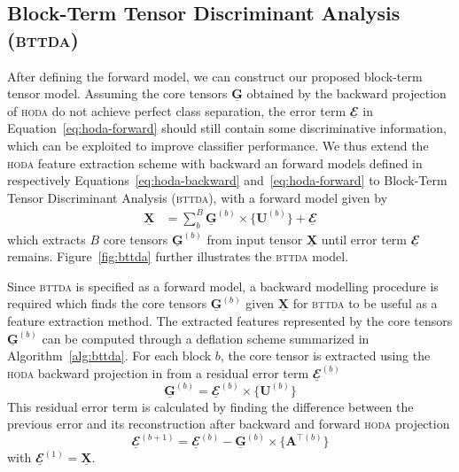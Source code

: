 \documentclass[twocolumn]{article}
\newcommand{\ten}[1]{\underline{\mathbf{#1}}} %
\newcommand{\mat}[1]{\mathbf{#1}} %
\newcommand{\mmpr}[1]{\times\{#1\}} %
\begin{document}
\subsection{Block-Term Tensor Discriminant Analysis (\textsc{bttda})}
After defining the forward model, we can construct our proposed block-term
tensor model. Assuming the core tensors $\ten{G}$
obtained by the backward projection of \textsc{hoda} do not achieve perfect
class separation, the error term $\ten{\mathbfcal{E}}$ in
Equation~\ref{eq:hoda-forward} should still contain some discriminative
information, which can be exploited to improve classifier performance.
We thus extend the \textsc{hoda} feature extraction scheme with backward an
forward models defined in respectively Equations~\ref{eq:hoda-backward}
and~\ref{eq:hoda-forward} to Block-Term Tensor Discriminant Analysis
(\textsc{bttda}), with a forward model given by
\begin{align}
  \ten{X} & = \sum_b^B\ten{G}^{(b)}\mmpr{\mat{U}^{(b)}} + \ten{\mathbfcal{E}}
  \label{eq:bttda-forward}
\end{align}
which extracts $B$ core tensors $\ten{G}^{(b)}$ from input tensor $\ten{X}$
until error term $\ten{\mathbfcal{E}}$ remains.
Figure~\ref{fig:bttda} further illustrates the \textsc{bttda} model.
\begin{figure*}
	\centering
	
  \caption{A forward model for Block-Term Tensor Discriminant Analysis
  (\textsc{bttda}). \textsc{bttda} can extract more features
 than \textsc{hoda} by iteratively finding a core tensor $\ten{G}^{(b)}$ in a
 deflation scheme.
 The \textsc{hoda} backward projection is first applied. Next, the reconstructed
 input data is reconstructed via the \textsc{hoda} forward model and the
 difference between the two is found.
 Finally, this process is repeated with this difference as input data, until a
 desired number of blocks $B$ has been found.}
  \label{fig:bttda}
\end{figure*}

Since \textsc{bttda} is specified as a forward model, a backward modelling
procedure is required which finds the core tensors $\ten{G}^{(b)}$ given $\ten{X}$ for
\textsc{bttda} to be useful as a feature extraction method.
The extracted features represented by the core tensors $\ten{G}^{(b)}$ can be
computed through a deflation scheme summarized in Algorithm~\ref{alg:bttda}.
For each block $b$, the core tensor is extracted using the \textsc{hoda} backward
projection in from a residual error term
$\ten{\mathbfcal{E}}^{(b)}$
\begin{equation}
  \ten{G}^{(b)} = \ten{\mathbfcal{E}}^{(b)}\mmpr{\mat{U}^{(b)}}
\end{equation}
This residual error term is calculated by finding the difference between the
previous error and its reconstruction after backward and forward \textsc{hoda}
projection
\begin{equation}
  \ten{\mathbfcal{E}}^{(b+1)} = \ten{\mathbfcal{E}}^{(b)} - \ten{G}^{(b)}
  \mmpr{\mat{A}^{\intercal(b)}}
\end{equation}
with $\ten{\mathbfcal{E}}^{(1)}=\ten{X}$.
\end{document}
